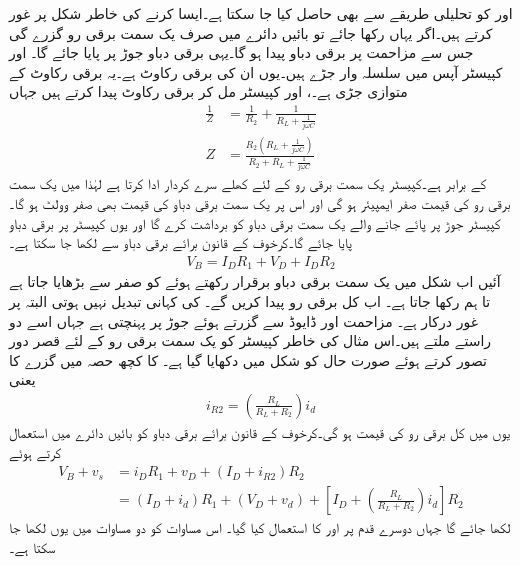  اور  کو تحلیلی طریقے سے بھی حاصل کیا جا سکتا ہے۔ایسا کرنے کی خاطر شکل  پر غور کرتے ہیں۔اگر یہاں  رکھا جائے تو بائیں دائرے میں صرف یک سمت برقی رو  گزرے گی جس سے مزاحمت  پر برقی دباو  پیدا ہو گا۔یہی برقی دباو جوڑ  پر پایا جائے گا۔ اور کپیسٹر  آپس میں سلسلہ وار جڑے ہیں۔یوں ان کی برقی رکاوٹ  ہے۔یہ برقی رکاوٹ  کے متوازی جڑی ہے۔، اور کپیسٹر مل کر برقی رکاوٹ  پیدا کرتے ہیں جہاں
\begin{align}
\frac{1}{Z}&=\frac{1}{R_2}+\frac{1}{R_L+\frac{1}{j \omega C}}\\
Z&=\frac{R_2 \left(R_L+\frac{1}{j \omega C} \right)}{R_2+R_L+\frac{1}{j \omega C}}
\end{align}
کے برابر ہے۔کپیسٹر یک سمت برقی رو کے لئے کھلے سرے کردار ادا کرتا ہے لہٰذا  میں یک سمت برقی رو کی قیمت صفر ایمپیئر ہو گی اور اس پر یک سمت برقی دباو کی قیمت بھی صفر وولٹ ہو گا۔کپیسٹر  جوڑ  پر پائے جانے والے یک سمت برقی دباو کو برداشت کرے گا اور یوں کپیسٹر پر  برقی دباو پایا جائے گا۔کرخوف کے قانون برائے برقی دباو سے لکھا جا سکتا ہے۔
\begin{align} \label{مساوات_ٹرانزسٹر_یکسمتی_منبع_بار_مساوات_جزو}
V_B=I_D R_1+V_D+I_D R_2
\end{align}
آئیں اب شکل  میں یک سمت برقی دباو  برقرار رکھتے ہوئے  کو صفر سے بڑھایا جاتا ہے تا ہم  رکھا جاتا ہے۔ اب کل برقی رو  پیدا کریں گے۔ کی کہانی تبدیل نہیں ہوتی البتہ  پر غور درکار ہے۔ مزاحمت  اور ڈایوڈ سے گزرتے ہوئے جوڑ  پر پہنچتی ہے جہاں اسے دو راستے ملتے ہیں۔اس مثال کی خاطر کپیسٹر کو یک سمت برقی رو کے لئے قصر دور تصور کرتے ہوئے صورت حال کو شکل میں دکھایا گیا ہے۔ کا کچھ حصہ  میں گزرے کا یعنی
\begin{align}
i_{R2}=\left(\frac{R_L}{R_L+R_2}\right) i_d
\end{align}
یوں  میں کل برقی رو کی قیمت  ہو گی۔کرخوف کے قانون برائے برقی دباو کو بائیں دائرے میں استعمال کرتے ہوئے
\begin{align*}
V_B+v_s&=i_D R_1+v_D+\left(I_D+i_{R2} \right)R_2\\
&=\left(I_D+i_d \right)R_1+ \left(V_D+v_d \right)+\left[I_D+\left(\frac{R_L}{R_L+R_2}\right) i_d \right]R_2
\end{align*}
لکھا جائے گا جہاں دوسرے قدم پر  اور  کا استعمال کیا گیا۔ اس مساوات کو دو مساوات میں یوں لکھا جا سکتا ہے۔

